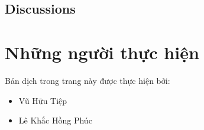 \documentclass[letterpaper,11pt,english]{sphinxmanual}
\begin{document}
\subsection{Discussions\sphinxfootnotemark[38]}
\label{\detokenize{chapter_appendix_math/statistics:discussions}}%
\begin{footnotetext}[38]\sphinxAtStartFootnote
{}
%
\end{footnotetext}\ignorespaces 
\begin{center}\end{center}


\section{Những người thực hiện}
\label{\detokenize{chapter_appendix_math/index_vn:nhung-nguoi-thuc-hien}}
Bản dịch trong trang này được thực hiện bởi:


\begin{itemize}
\item {} 
Vũ Hữu Tiệp

\item {} 
Lê Khắc Hồng Phúc

\end{itemize}



\renewcommand{\indexname}{Index}
\printindex
\end{document}
